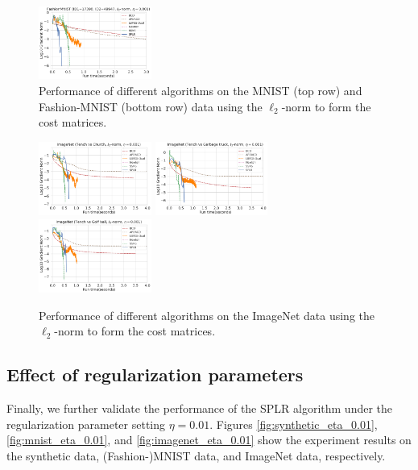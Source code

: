 \documentclass{article}
\theoremstyle{plain}
\theoremstyle{definition}
\theoremstyle{remark}
\begin{document}
\begin{figure}[h]
    \includegraphics[width=0.33\textwidth]{save/FashionMNIST - Extra/run_times/ID1=17390, ID2=49947, norm=l2, reg=0.001}
    \caption{Performance of different algorithms on the MNIST (top row) and Fashion-MNIST (bottom row) data using the $\ell_2$-norm to form the cost matrices.}
    \label{fig:mnist_l2}
\end{figure}

\begin{figure}[h]
    \centering
    \includegraphics[width=0.33\textwidth]{save/ImageNet - Extra/run_times/CLASS1=tench, CLASS2=church, dim=30, norm=l2, reg=0.001}
    \includegraphics[width=0.33\textwidth]{save/ImageNet - Extra/run_times/CLASS1=tench, CLASS2=garbage truck, dim=30, norm=l2, reg=0.001}
    \includegraphics[width=0.33\textwidth]{save/ImageNet - Extra/run_times/CLASS1=tench, CLASS2=golf ball, dim=30, norm=l2, reg=0.001}
    \caption{Performance of different algorithms on the ImageNet data using the $\ell_2$-norm to form the cost matrices.}
    \label{fig:imagenet_l2}
\end{figure}

\subsection{Effect of regularization parameters}
\label{appendix:extra-eta}
Finally, we further validate the performance of the SPLR algorithm under the regularization parameter setting $\eta=0.01$.
Figures \ref{fig:synthetic_eta_0.01}, \ref{fig:mnist_eta_0.01}, and
\ref{fig:imagenet_eta_0.01} show the experiment results on the synthetic data, (Fashion-)MNIST data, and ImageNet data, respectively.
\end{document}
